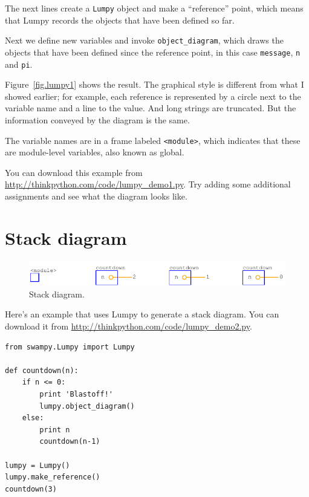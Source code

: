 \documentclass[10pt]{book}
\begin{document}
The next lines create a {\tt Lumpy} object and make a ``reference''
point, which means that Lumpy records the objects that have been
defined so far.

Next we define new variables and invoke \verb"object_diagram",
which draws the objects that have been defined since the reference
point, in this case {\tt message}, {\tt n} and {\tt pi}.

Figure~\ref{fig.lumpy1} shows the result.  The graphical style is
different from what I showed earlier; for example, each
reference is represented by a circle next to the variable name and a
line to the value.  And long strings are truncated.  But the
information conveyed by the diagram is the same.

The variable names are in a frame labeled \verb"<module>", which
indicates that these are module-level variables, also known as
global.

You can download this example from
\url{http://thinkpython.com/code/lumpy_demo1.py}.  Try adding some
additional assignments and see what the diagram looks like.


\section{Stack diagram}

\begin{figure}
\centerline
{\includegraphics[scale=0.7]{figs/lumpydemo2.pdf}}
\caption{Stack diagram.}
\label{fig.lumpy2}
\end{figure}

Here's an example that uses Lumpy to generate a stack diagram.
You can download it from \url{http://thinkpython.com/code/lumpy_demo2.py}.
 

\begin{verbatim}
from swampy.Lumpy import Lumpy

def countdown(n):
    if n <= 0:
        print 'Blastoff!'
        lumpy.object_diagram()
    else:
        print n
        countdown(n-1)

lumpy = Lumpy()
lumpy.make_reference()
countdown(3)
\end{verbatim}
\end{document}
